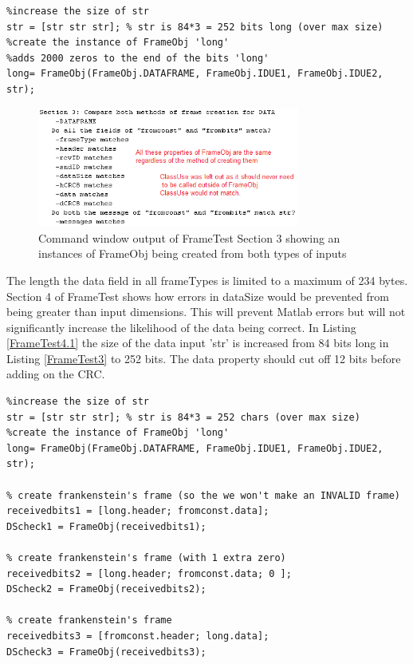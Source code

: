 \begin{lstlisting} 
%increase the size of str
str = [str str str]; % str is 84*3 = 252 bits long (over max size)
%create the instance of FrameObj 'long'
%adds 2000 zeros to the end of the bits 'long'
long= FrameObj(FrameObj.DATAFRAME, FrameObj.IDUE1, FrameObj.IDUE2, str);
\end{lstlisting} 
\begin{figure}[h]
    \includegraphics[width=0.77\textwidth, left]{FrameTest3.PNG}
    \caption{Command window output of FrameTest Section 3 showing an instances of FrameObj being created from both types of inputs }
    \label{fig:FrameTest3}
\end{figure}

The length the data field in all frameTypes is limited to a maximum of 234 bytes. Section 4 of FrameTest shows how errors in dataSize would be prevented from being greater than input dimensions. This will prevent Matlab errors but will not significantly increase the likelihood of the data being correct. In Listing \ref{FrameTest4.1} the size of the data input 'str' is increased from 84 bits long in Listing \ref{FrameTest3} to 252 bits. The data property should cut off 12 bits before adding on the CRC.

\begin{lstlisting} 
%increase the size of str
str = [str str str]; % str is 84*3 = 252 chars (over max size)
%create the instance of FrameObj 'long'
long= FrameObj(FrameObj.DATAFRAME, FrameObj.IDUE1, FrameObj.IDUE2, str);

% create frankenstein's frame (so the we won't make an INVALID frame)
receivedbits1 = [long.header; fromconst.data];
DScheck1 = FrameObj(receivedbits1);

% create frankenstein's frame (with 1 extra zero)
receivedbits2 = [long.header; fromconst.data; 0 ];
DScheck2 = FrameObj(receivedbits2);

% create frankenstein's frame
receivedbits3 = [fromconst.header; long.data];
DScheck3 = FrameObj(receivedbits3);
\end{lstlisting} 

